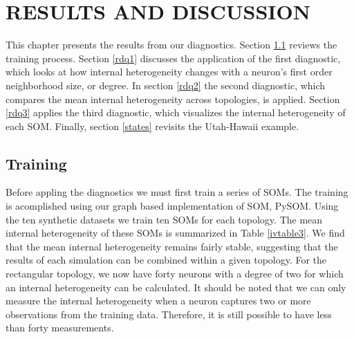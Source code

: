 \chapter{RESULTS AND DISCUSSION}
This chapter presents the results from our diagnostics.  Section \ref{rtrain}
reviews the training process.  Section \ref{rdq1} discusses the application of
the first diagnostic, which looks at how internal heterogeneity changes with a
neuron's first order neighborhood size, or degree.  In section \ref{rdq2} the
second diagnostic, which compares the mean internal heterogeneity across
topologies, is applied.  Section \ref{rdq3} applies the third
diagnostic, which visualizes the internal heterogeneity of each SOM. Finally,
section \ref{states} revisits the Utah-Hawaii example.

\section{Training}
\label{rtrain}
Before appling the diagnostics we must first train a series of SOMs.  The
training is acomplished using our graph based implementation of SOM, PySOM.
Using the ten synthetic datasets we train ten SOMs for each topology.  The
mean internal heterogeneity of these SOMs is summarized in Table
\ref{ivtable3}.  We find that the mean internal heterogeneity remains fairly
stable, suggesting that the results of each simulation can be combined within
a given topology.  For the rectangular topology, we now have forty neurons
with a degree of two for which an internal heterogeneity can be calculated. It
should be noted that we can only measure the internal heterogeneity when a
neuron captures two or more observations from the training data.  Therefore,
it is still possible to have less than forty measurements.

